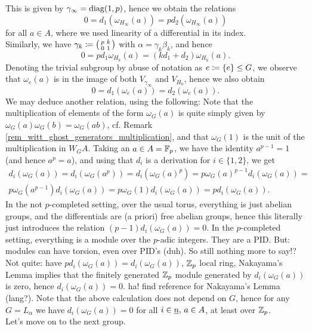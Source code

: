 This is given by $\gamma_\infty = \mathrm{diag}(1,p)$, hence we obtain the relations
\begin{equation}\label{eq_group_diag(p,p)_subgroup_diag(1,p)}
	0 = d_1(\omega_{H_\infty}(a)) = p d_2 (\omega_{H_\infty}(a))
\end{equation}
for all $a \in A$, where we used linearity of a differential in its index.\\
Similarly, we have $\gamma_k \coloneqq \left( \begin{smallmatrix} p & k \\ 0 & 1 \end{smallmatrix} \right)$ with $\alpha =
\gamma_k \beta_k$, and hence
\begin{equation}\label{eq_group_diag(p,p)_subgroup_(p,k_0,1)}
	0 = p d_1  \omega_{H_k}(a) = (k d_1 + d_2) \omega_{H_k}(a).
\end{equation}
Denoting the trivial subgroup by abuse of notation as $e \coloneqq \{e\} \leq G$,
we observe that $\omega_e(a)$ is in the image of both $V_{\gamma_\infty}$ and
$V_{H_0}$, hence we also obtain
\begin{equation*}
	0 = d_1(\omega_e(a)) = d_2 (\omega_e(a)).
\end{equation*}
We may deduce another relation, using the following: Note that the
multiplication of elements of the form $\omega_G(a)$ is quite simply given by
$\omega_G (a) \omega_G (b) = \omega_G (ab)$, cf. Remark
\ref{rem_witt_ghost_generators_multiplication}, and that $\omega_G(1)$ is the
unit of the multiplication in $W_G A$. Taking an $a \in A = \mathbb{F}_p$, we have the
identity $a^{p-1} = 1$ (and hence $a^p=a$), and using that $d_i$ is a derivation
for $i \in \{1,2\}$, we get
\begin{gather*}
	d_i(\omega_G(a)) = d_i(\omega_G(a^p)) = d_i(\omega_G(a)^p) = p
	\omega_G(a)^{p-1} d_i(\omega_G(a)) = \\ %
	p \omega_G(a^{p-1}) d_i(\omega_G(a)) = p \omega_G(1) d_i(\omega_G(a)) =
	p d_i(\omega_G(a)). %
\end{gather*}
 In the not $p$-completed setting, over the usual
torus, everything is just abelian groups, and the differentials are (a priori)
free abelian groups, hence this literally just introduces the relation $(p-1)d_i
(\omega_G(a)) = 0$. In the $p$-completed setting, everything is a module over
the $p$-adic integers. They are a PID. But: modules can have torsion, even over
PID's (duh). So still nothing more to say!? Not quite: have $p d_i (\omega_G(a))
= d_i (\omega_G(a))$, $\mathbb{Z}_p$ local ring, Nakayama's Lemma implies that the
finitely generated $\mathbb{Z}_p$ module generated by $d_i (\omega_G(a))$ is zero,
hence $d_i (\omega_G(a)) = 0$. ha! find reference for Nakayama's Lemma (lang?).
Note that the above calculation does not depend on $G$, hence for any $G =
L_\alpha$ we have $d_i(\omega_G(a)) = 0$ for all $i\in \underline{n},\, a \in A$, at
least over $\mathbb{Z}_p$.\\
Let's move on to the next group.
